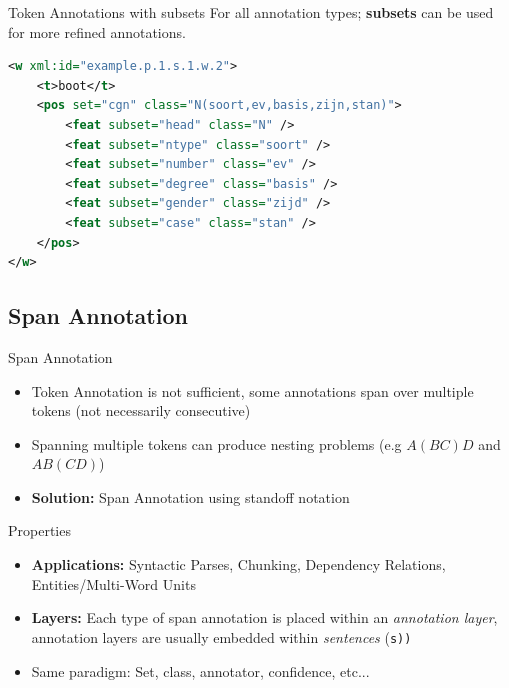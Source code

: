 \documentclass[compress,10pt]{beamer}
\begin{document}
\begin{frame}[fragile]

	\begin{block}{Token Annotations with subsets}
		For all annotation types; \textbf{subsets} can be used for more refined annotations.  
	\end{block}
	
	\begin{example}
\begin{lstlisting}[language=xml]
<w xml:id="example.p.1.s.1.w.2">
    <t>boot</t>
    <pos set="cgn" class="N(soort,ev,basis,zijn,stan)">
    	<feat subset="head" class="N" />
        <feat subset="ntype" class="soort" />
        <feat subset="number" class="ev" />
        <feat subset="degree" class="basis" />
        <feat subset="gender" class="zijd" />
        <feat subset="case" class="stan" />
    </pos>
</w>
\end{lstlisting}   
	\end{example} 

\end{frame}



\subsection{Span Annotation}
        
\begin{frame}
    \begin{block}{Span Annotation}
        \begin{itemize}
            \item Token Annotation is not sufficient, some annotations span over multiple tokens (not necessarily consecutive)
            \item Spanning multiple tokens can produce nesting problems (e.g $A (B C) D$ and $A B (C D)$)                
            \item \textbf{Solution:} Span Annotation using standoff notation
        \end{itemize}        
    \end{block}
    
    \begin{block}{Properties}
    	\begin{itemize}
    	 \item \textbf{Applications:} Syntactic Parses, Chunking, Dependency Relations, Entities/Multi-Word Units    	
         \item \textbf{Layers:} Each type of span annotation is placed within an \emph{annotation layer}, annotation layers are usually embedded within \emph{sentences} (\texttt{s))}
         \item Same paradigm: Set, class, annotator, confidence, etc...
        \end{itemize}
    \end{block}
\end{frame}
\end{document}
